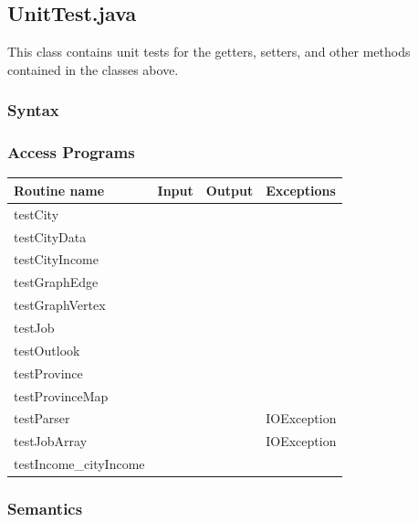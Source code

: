 \documentclass[12pt,fleqn]{article}
\begin{document}
\subsection*{UnitTest.java}
This class contains unit tests for the getters, setters, and other methods contained in the classes above.
\subsubsection*{Syntax}
\subsubsection* {Access Programs}
\begin{tabular}{| l | l | l | l |}
\hline
\textbf{Routine name} & \textbf{Input} & \textbf{Output} & \textbf{Exceptions}\\
\hline
testCity & ~ & ~ & ~\\
\hline
testCityData & ~ & ~ & ~\\
\hline
testCityIncome & ~ & ~ & ~\\
\hline
testGraphEdge & ~ & ~ & ~\\
\hline
 testGraphVertex& ~ & ~ & ~\\
\hline
testJob & ~ & ~ & ~\\
\hline
testOutlook & ~ & ~ & ~\\
\hline
testProvince & ~ & ~ & ~\\
\hline
testProvinceMap & ~ & ~ & ~\\
\hline
testParser & ~ & ~ & IOException\\
\hline
testJobArray & ~ & ~ & IOException\\
\hline
testIncome\_cityIncome & ~ & ~ & ~\\
\hline
\end{tabular}
\subsubsection*{Semantics}
\end{document}
